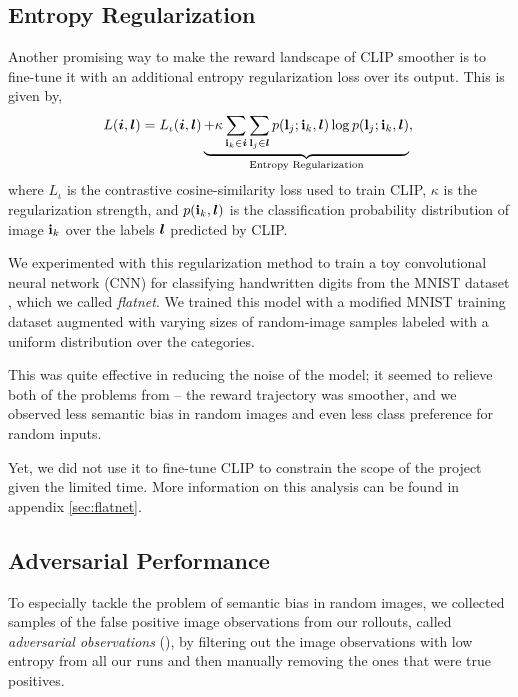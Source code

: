 
\subsection{Entropy Regularization}
\label{sec:entropy-regularization}
Another promising way to make the reward landscape of CLIP smoother is to fine-tune it with an additional entropy regularization loss over its output.
This is given by,
\begin{equation}
    \label{eq:entropy-regularization}
    L(\bm{i}, \bm{l}) = L_{\iota}(\bm{i}, \bm{l}) \underbrace{+ \kappa \sum_{\mathbf{i}_k \in \bm{i}}\sum_{\mathbf{l}_j \in \bm{l}} p(\mathbf{l}_j; \mathbf{i}_k, \bm{l}) \log p(\mathbf{l}_j; \mathbf{i}_k, \bm{l})}_{\text{Entropy Regularization}},\\
\end{equation}
where \(L_{\iota}\) is the contrastive cosine-similarity loss used to train CLIP, $\kappa$ is the regularization strength, and \(p(\mathbf{i}_k, \bm{l})\) is the classification probability distribution of image \(\mathbf{i}_k\) over the labels \(\bm{l}\) predicted by CLIP.

We experimented with this regularization method to train a toy convolutional neural network (CNN) for classifying handwritten digits from the MNIST dataset \citep{mnist}, which we called \emph{flatnet}.
We trained this model with a modified MNIST training dataset augmented with varying sizes of random-image samples labeled with a uniform distribution over the categories.

This was quite effective in reducing the noise of the model; it seemed to relieve both of the problems from  -- the reward trajectory was smoother, and we observed less semantic bias in random images and even less class preference for random inputs.

Yet, we did not use it to fine-tune CLIP to constrain the scope of the project given the limited time.
More information on this analysis can be found in appendix \ref{sec:flatnet}.

\subsection{Adversarial Performance}
\label{sec:adversarial-performance}
To especially tackle the problem of semantic bias in random images, we collected samples of the false positive image observations from our rollouts, called \emph{adversarial observations} (), by filtering out the image observations with low entropy from all our runs and then manually removing the ones that were true positives.


